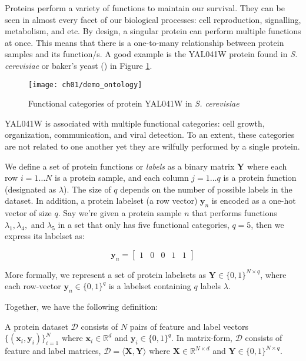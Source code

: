\par Proteins perform a variety of functions to maintain our survival. They
can be seen in almost every facet of our biological processes: cell
reproduction, signalling, metabolism, and etc. By design, a singular protein
can perform multiple functions at once. This means that there is a
one-to-many relationship between protein samples and its function/s. A good
example is the YAL041W protein found in \textit{S. cerevisiae} or baker's
yeast (\cite{elisseeff2001kernel}) in Figure \ref{demo:yeast_go}. 


\begin{figure}[!h]
  \centering
  \texttt{[image: ch01/demo\_ontology]}
  \caption{Functional categories of protein YAL041W in \textit{S. cerevisiae}}
  \label{demo:yeast_go}
\end{figure}

\noindent YAL041W is associated with multiple functional categories: cell growth,
organization, communication, and viral detection. To an extent, these
categories are not related to one another yet they are wilfully performed by
a single protein.

\par We define a set of protein functions or \textit{labels} as a binary
matrix $\mathbf{Y}$ where each row $i=1 \dots N$ is a protein sample, and
each column $j=1 \dots q$ is a protein function (designated as $\lambda$).
The size of $q$ depends on the number of possible labels in the dataset. In
addition, a protein labelset (a row vector) $\mathbf{y}_n$ is encoded as a
one-hot vector of size $q$. Say we're given a protein sample $n$ that performs
functions $\lambda_1, \lambda_4,$ and $\lambda_5$ in a set that only has
five functional categories, $q=5$, then we express its labelset as:

\[
    \mathbf{y}_n = \left[\begin{matrix}
        1 & 0 & 0 & 1 & 1
    \end{matrix} \right]
\]

More formally, we represent a set of protein labelsets as $\mathbf{Y} \in
\{0,1\}^{N \times q}$, where each row-vector $\mathbf{y}_n \in \{0,1\}^q$
is a labelset containing $q$ labels $\lambda$. 


\newpage
Together, we have the following definition:

\begin{definition}{}
A protein dataset $\mathcal{D}$ consists of $N$ pairs of feature and label
vectors $\{(\mathbf{x}_i, \mathbf{y}_i)\}_{i=1}^{N}$ where $\mathbf{x}_i \in
\mathbb{R}^d$ and $\mathbf{y}_i \in \{0,1\}^q$. In matrix-form, $\mathcal{D}$
consists of feature and label matrices, $\mathcal{D} = \langle \mathbf{X},
\mathbf{Y} \rangle$ where $\mathbf{X} \in \mathbb{R}^{N \times d}$ and
$\mathbf{Y} \in \{0,1\}^{N \times q}$.
\end{definition}


